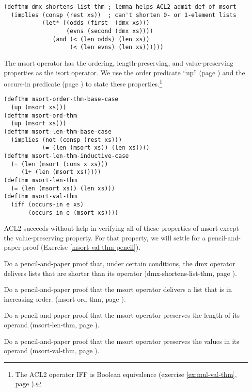 \label{defthm:dmx-shortens-list}
\begin{Verbatim}
(defthm dmx-shortens-list-thm ; lemma helps ACL2 admit def of msort
  (implies (consp (rest xs))  ; can't shorten 0- or 1-element lists
           (let* ((odds (first  (dmx xs)))
                  (evns (second (dmx xs))))
              (and (< (len odds) (len xs))
                   (< (len evns) (len xs))))))
\end{Verbatim}

The msort operator has the ordering, length-preserving,
and value-preserving properties as the isort operator.
We use the order predicate ``up'' (page \pageref{defun:up})
and the occurs-in predicate (page \pageref{def:occurs-in})
to state these properties.\footnote{The ACL2 operator
IFF is Boolean equivalence
(exercise \ref{ex:mul-val-thm}, page \pageref{def:equivalence-op}).}

\label{defthm:msort-ord}
\label{defthm:msort-len}
\label{defthm:msort-val}
\begin{Verbatim}
(defthm msort-order-thm-base-case
  (up (msort xs)))
(defthm msort-ord-thm
  (up (msort xs)))
(defthm msort-len-thm-base-case
  (implies (not (consp (rest xs)))
           (= (len (msort xs)) (len xs))))
(defthm msort-len-thm-inductive-case
  (= (len (msort (cons x xs)))
     (1+ (len (msort xs)))))
(defthm msort-len-thm
  (= (len (msort xs)) (len xs)))
(defthm msort-val-thm
  (iff (occurs-in e xs)
       (occurs-in e (msort xs))))
\end{Verbatim}

ACL2 succeeds without help in verifying all of these properties of msort
except the value-preserving property. For that property,
we will settle for a pencil-and-paper proof (Exercise \ref{msort-val-thm-pencil}).

\begin{ExerciseList}
\Exercise
Do a pencil-and-paper proof that, under certain conditions, the dmx operator
delivers lists that are shorter than its operator
(dmx-shortens-list-thm, page \pageref{defthm:dmx-shortens-list}).

\Exercise
Do a pencil-and-paper proof that the msort operator
delivers a list that is in increasing order.
(msort-ord-thm, page \pageref{defthm:msort-ord}).

\Exercise
Do a pencil-and-paper proof that the msort operator
preserves the length of its operand
(msort-len-thm, page \pageref{defthm:msort-len}).

\Exercise
\label{msort-val-thm-pencil}
Do a pencil-and-paper proof that the msort operator
preserves the values in its operand
(msort-val-thm, page \pageref{defthm:msort-val}).
\end{ExerciseList}

